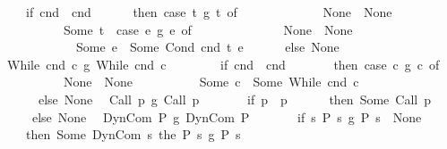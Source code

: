 \begin{isabellebody}
\ \ \ \ \ {\isacharparenleft}if\ cnd{}\ {\isacharequal}\ cnd{}\isanewline
\ \ \ \ \ \ then\ {\isacharparenleft}case\ t{}\ {\isasyminter}\isactrlsub g\ t{}\ of\ \isanewline
\ \ \ \ \ \ \ \ \ \ \ \ None\ {\isasymRightarrow}\ None\isanewline
\ \ \ \ \ \ \ \ \ \ {\isacharbar}\ Some\ t\ {\isasymRightarrow}\ {\isacharparenleft}case\ e{}\ {\isasyminter}\isactrlsub g\ e{}\ of\isanewline
\ \ \ \ \ \ \ \ \ \ \ \ \ \ None\ {\isasymRightarrow}\ None\isanewline
\ \ \ \ \ \ \ \ \ \ \ \ {\isacharbar}\ Some\ e\ {\isasymRightarrow}\ Some\ {\isacharparenleft}Cond\ cnd{}\ t\ e{\isacharparenright}{\isacharparenright}{\isacharparenright}\isanewline
\ \ \ \ \ \ else\ None{\isacharparenright}{\isachardoublequoteclose}\isanewline
\ \ {\isachardoublequoteopen}{\isacharparenleft}While\ cnd{}\ c{}\ {\isasyminter}\isactrlsub g\ While\ cnd{}\ c{}{\isacharparenright}\ {\isacharequal}\ \isanewline
\ \ \ \ \ \ {\isacharparenleft}if\ cnd{}\ {\isacharequal}\ cnd{}\isanewline
\ \ \ \ \ \ \ then\ {\isacharparenleft}case\ c{}\ {\isasyminter}\isactrlsub g\ c{}\ of\isanewline
\ \ \ \ \ \ \ \ \ \ \ None\ {\isasymRightarrow}\ None\isanewline
\ \ \ \ \ \ \ \ \ {\isacharbar}\ Some\ c\ {\isasymRightarrow}\ Some\ {\isacharparenleft}While\ cnd{}\ c{\isacharparenright}{\isacharparenright}\isanewline
\ \ \ \ \ \ \ else\ None{\isacharparenright}{\isachardoublequoteclose}\isanewline
\ \ {\isachardoublequoteopen}{\isacharparenleft}Call\ p{}\ {\isasyminter}\isactrlsub g\ Call\ p{}{\isacharparenright}\ {\isacharequal}\ \isanewline
\ \ \ \ \ {\isacharparenleft}if\ p{}\ {\isacharequal}\ p{}\isanewline
\ \ \ \ \ \ then\ Some\ {\isacharparenleft}Call\ p{}{\isacharparenright}\isanewline
\ \ \ \ \ \ else\ None{\isacharparenright}{\isachardoublequoteclose}\isanewline
\ \ {\isachardoublequoteopen}{\isacharparenleft}DynCom\ P{}\ {\isasyminter}\isactrlsub g\ DynCom\ P{}{\isacharparenright}\ {\isacharequal}\ \isanewline
\ \ \ \ \ {\isacharparenleft}if\ {\isacharparenleft}{\isasymforall}s{\isachardot}\ {\isacharparenleft}P{}\ s\ {\isasyminter}\isactrlsub g\ P{}\ s{\isacharparenright}\ {\isasymnoteq}\ None{\isacharparenright}\isanewline
\ \ \ \ \ then\ Some\ {\isacharparenleft}DynCom\ {\isacharparenleft}{\isasymlambda}s{\isachardot}\ the\ {\isacharparenleft}P{}\ s\ {\isasyminter}\isactrlsub g\ P{}\ s{\isacharparenright}{\isacharparenright}{\isacharparenright}\isanewline

\end{isabellebody}
